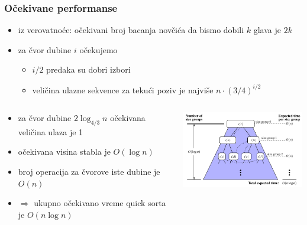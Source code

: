 \documentclass[compress,aspectratio=169]{beamer}
\begin{document}
\begin{frame}[fragile]
  \frametitle{Očekivane performanse}
  \begin{itemize}
    \item iz verovatnoće: očekivani broj bacanja novčića da bismo dobili $k$ glava je $2k$
    \item za čvor dubine $i$ očekujemo
    \begin{itemize}
      \item $i/2$ predaka su dobri izbori
      \item veličina ulazne sekvence za tekući poziv je najviše $n\cdot (3/4)^{i/2}$
    \end{itemize}
  \end{itemize}
  \begin{columns}
    \begin{column}[t]{5cm}
      {\scriptsize
      \begin{itemize}
        \item za čvor dubine $2\log_{4/3}n$ očekivana veličina ulaza je 1
        \item očekivana visina stabla je $O(\log n)$
        \item broj operacija za čvorove iste dubine je $O(n)$
        \item $\Rightarrow$ ukupno očekivano vreme quick sorta je $O(n\log n)$ 
      \end{itemize}
      }
    \end{column}
    \begin{column}[t]{7cm}
      \begin{center}
        \includegraphics[width=7cm]{asp-12-pic26.pdf}
      \end{center}
    \end{column}
  \end{columns}
\end{frame}
\end{document}

